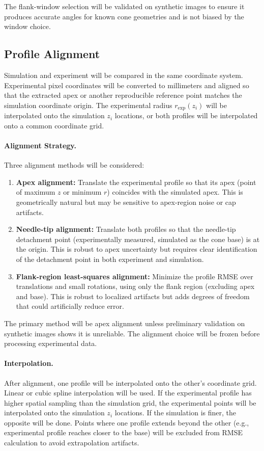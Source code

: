 The flank-window selection will be validated on synthetic images to ensure it produces accurate angles for known cone geometries and is not biased by the window choice.

\subsection{Profile Alignment}

Simulation and experiment will be compared in the same coordinate system. Experimental pixel coordinates will be converted to millimeters and aligned so that the extracted apex or another reproducible reference point matches the simulation coordinate origin. The experimental radius $r_{\mathrm{exp}}(z_i)$ will be interpolated onto the simulation $z_i$ locations, or both profiles will be interpolated onto a common coordinate grid.

\paragraph{Alignment Strategy.} Three alignment methods will be considered:

\begin{enumerate}
    \item \textbf{Apex alignment:} Translate the experimental profile so that its apex (point of maximum $z$ or minimum $r$) coincides with the simulated apex. This is geometrically natural but may be sensitive to apex-region noise or cap artifacts.
    \item \textbf{Needle-tip alignment:} Translate both profiles so that the needle-tip detachment point (experimentally measured, simulated as the cone base) is at the origin. This is robust to apex uncertainty but requires clear identification of the detachment point in both experiment and simulation.
    \item \textbf{Flank-region least-squares alignment:} Minimize the profile RMSE over translations and small rotations, using only the flank region (excluding apex and base). This is robust to localized artifacts but adds degrees of freedom that could artificially reduce error.
\end{enumerate}

The primary method will be apex alignment unless preliminary validation on synthetic images shows it is unreliable. The alignment choice will be frozen before processing experimental data.

\paragraph{Interpolation.} After alignment, one profile will be interpolated onto the other's coordinate grid. Linear or cubic spline interpolation will be used. If the experimental profile has higher spatial sampling than the simulation grid, the experimental points will be interpolated onto the simulation $z_i$ locations. If the simulation is finer, the opposite will be done. Points where one profile extends beyond the other (e.g., experimental profile reaches closer to the base) will be excluded from RMSE calculation to avoid extrapolation artifacts.

